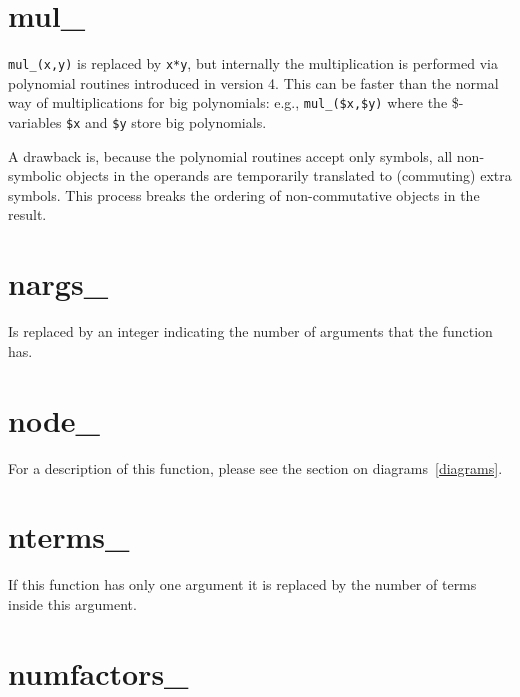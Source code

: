 
\section{mul\_}
\label{funmul}
\noindent \verb|mul_(x,y)| is replaced by \verb|x*y|, but internally
the multiplication is performed via polynomial routines introduced in
\FORM{} version 4. This can be faster than the normal way of multiplications
for big polynomials: e.g., \verb|mul_($x,$y)| where the \$-variables \verb|$x|
and \verb|$y| store big polynomials.

A drawback is, because the polynomial routines accept only symbols, all
non-symbolic objects in the operands are temporarily translated to (commuting)
extra symbols. This process breaks the ordering of non-commutative objects
in the result.


\section{nargs\_}
\label{funnargs}
\noindent Is replaced by an integer indicating the number of 
arguments that the function has.


\section{node\_}
\label{funnode}
\noindent For a description of this function, please see the section on 
diagrams~\ref{diagrams}.


\section{nterms\_}
\label{funnterms}
\noindent If this function has only one argument it is replaced by 
the number of terms inside this argument.


\section{numfactors\_}
\label{funnumfactors}

